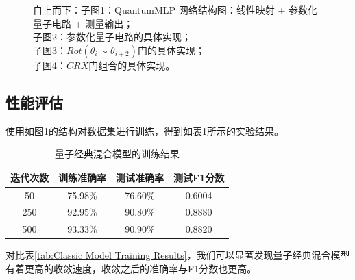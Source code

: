 \documentclass[10pt,a4paper,twoside]{article}
\numberwithin{figure}{section}%
\numberwithin{table}{section}%
\begin{document}
\begin{figure}[htb]
\caption{\centering 自上而下：子图1：QuantumMLP 网络结构图：线性映射 + 参数化量子电路 + 测量输出；\\ 子图2：参数化量子电路的具体实现；\\ 子图3：$Rot(\theta_{i}\sim\theta_{i+2})$门的具体实现；\\ 子图4：$CRX$门组合的具体实现。}
\label{fig:QuantumMLP}
\end{figure}



\subsection{性能评估}

使用如图\ref{fig:QuantumMLP}的结构对数据集进行训练，得到如表\ref{tab:Quantum Classic Model Training Results}所示的实验结果。

\begin{table}[H]
    \centering
    \caption{量子经典混合模型的训练结果}
    \label{tab:Quantum Classic Model Training Results}
    \begin{tabular}{cccc}
        \toprule
        \textbf{迭代次数} & \textbf{训练准确率} & \textbf{测试准确率} & \textbf{测试F1分数} \\
        \midrule
        50 & 75.98\% & 76.60\% & 0.6004 \\
        250 & 92.95\% & 90.80\% & 0.8880 \\
        500 & 93.33\% & 90.90\% & 0.8820 \\
        \bottomrule
    \end{tabular}
\end{table}

对比表\ref{tab:Classic Model Training Results}，我们可以显著发现量子经典混合模型有着更高的收敛速度，收敛之后的准确率与F1分数也更高。
\end{document}
